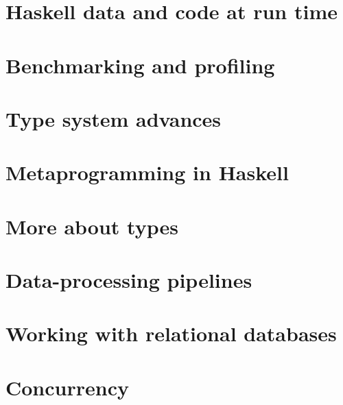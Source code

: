\documentclass[UTF8]{ctexart}
\begin{document}
\section{Haskell data and code at run time}

\newpage

\section{Benchmarking and profiling}

\newpage

\section{Type system advances}

\newpage

\section{Metaprogramming in Haskell}

\newpage

\section{More about types}

\newpage

\section{Data-processing pipelines}

\newpage

\section{Working with relational databases}

\newpage

\section{Concurrency}

\newpage
\end{document}
